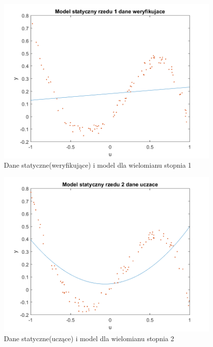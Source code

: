 \documentclass{article}
\begin{document}
\begin{figure}
\centering
\includegraphics[width=0.95\linewidth]{dane_statyczne_model_rzedu_1_weryf}
\caption{Dane statyczne(weryfikujące) i model dla wielomianu stopnia 1}
\label{fig:danestatyczneweryf1}
\end{figure}

\begin{figure}
\centering
\includegraphics[width=0.95\linewidth]{dane_statyczne_model_rzedu_2_uczace}
\caption{Dane statyczne(uczące) i model dla wielomianu stopnia 2}
\label{fig:danestatyczneuczace2}
\end{figure}
\end{document}
